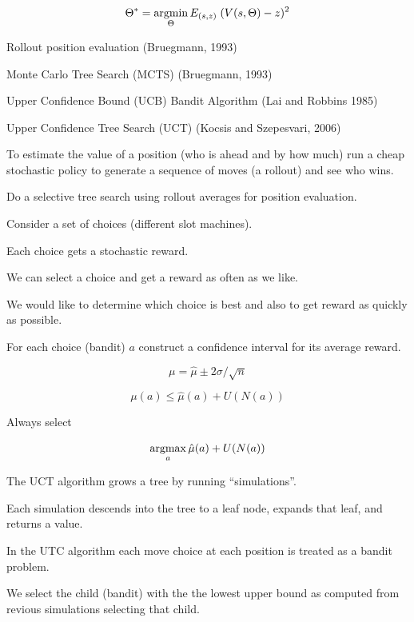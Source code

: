 {\vfill
$$\Theta^* = \operatorname*{argmin}_\Theta E_{(s,z)}\;(V(s,\Theta) - z)^2$$


Rollout position evaluation (Bruegmann, 1993)

\vfill
Monte Carlo Tree Search (MCTS) (Bruegmann, 1993)

\vfill
Upper Confidence Bound (UCB) Bandit Algorithm (Lai and Robbins 1985)

\vfill
Upper Confidence Tree Search (UCT) (Kocsis and Szepesvari, 2006)


To estimate the value of a position (who is ahead and by how much)
run a cheap stochastic policy to generate a sequence of moves (a rollout) and see who wins.

\vfill
Do a selective tree search using rollout averages for position evaluation.


Consider a set of choices (different slot machines).

Each choice gets a stochastic reward.

\vfill
We can select a choice and get a reward as often as we like.

\vfill
We would like to determine which choice is best and also to get reward as quickly as possible.


For each choice (bandit) $a$ construct a confidence interval for its average reward.

\vfill
$$\mu = \hat{\mu} \pm 2\sigma/\sqrt{n}$$

\vfill
$$\mu(a) \leq \hat{\mu}(a) + U(N(a))$$

\vfill
Always select

$$\operatorname*{argmax}_a \hat{\mu}(a) + U(N(a))$$


The UCT algorithm grows a tree by running ``simulations''.

\vfill
Each simulation descends into the tree to a leaf node, expands that leaf, and returns a value.

\vfill
In the UTC algorithm each move choice at each position is treated as a bandit problem.

\vfill
We select the child (bandit) with the the lowest upper bound as computed from revious simulations selecting that child.

}
